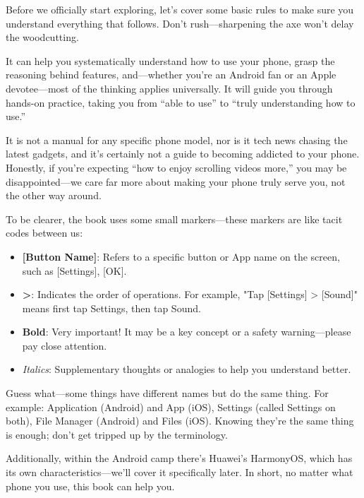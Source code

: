 
Before we officially start exploring, let's cover some basic rules to make sure you understand everything that follows. Don't rush—sharpening the axe won't delay the woodcutting.


It can help you systematically understand how to use your phone, grasp the reasoning behind features, and—whether you're an Android fan or an Apple devotee—most of the thinking applies universally. It will guide you through hands-on practice, taking you from “able to use” to “truly understanding how to use.”

It is not a manual for any specific phone model, nor is it tech news chasing the latest gadgets, and it's certainly not a guide to becoming addicted to your phone. Honestly, if you're expecting “how to enjoy scrolling videos more,” you may be disappointed—we care far more about making your phone truly serve you, not the other way around.


To be clearer, the book uses some small markers—these markers are like tacit codes between us:

\begin{itemize}
  \item \textbf{[Button Name]}: Refers to a specific button or App name on the screen, such as [Settings], [OK].
  \item \textbf{>}: Indicates the order of operations. For example, "Tap [Settings] > [Sound]" means first tap Settings, then tap Sound.
  \item \textbf{Bold}: Very important! It may be a key concept or a safety warning—please pay close attention.
  \item \emph{Italics}: Supplementary thoughts or analogies to help you understand better.
\end{itemize}


Guess what—some things have different names but do the same thing. For example: Application (Android) and App (iOS), Settings (called Settings on both), File Manager (Android) and Files (iOS). Knowing they're the same thing is enough; don't get tripped up by the terminology.

Additionally, within the Android camp there's Huawei's HarmonyOS, which has its own characteristics—we'll cover it specifically later. In short, no matter what phone you use, this book can help you.

